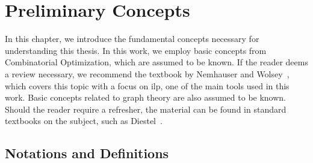 \chapter{Preliminary Concepts}\label{chp:preliminary-concepts}

In this chapter, we introduce the fundamental concepts necessary for
understanding this thesis. In this work, we employ basic concepts from
Combinatorial Optimization, which are assumed to be known. If the reader deems a
review necessary, we recommend the textbook by Nemhauser and
Wolsey~\cite{Nemhauser}, which covers this topic with a focus on \gls{ilp}, one
of the main tools used in this work. Basic concepts related to graph theory are
also assumed to be known. Should the reader require a refresher, the material
can be found in standard textbooks on the subject, such as
Diestel~\cite{diestel:2005}.


\section{Notations and Definitions}\label{sec:not-e-def}




